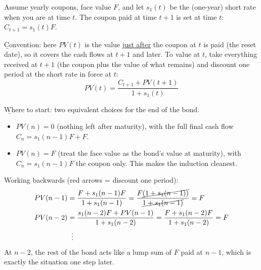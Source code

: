 Assume yearly coupons, face value $F$, and let $s_1(t)$ be the (one-year) short rate when you are at time $t$. The coupon paid at time $t+1$ is set at time $t$: $C_{t+1} = s_1(t)F$.

\begin{center}
\end{center}
\b{Convention}: here $PV(t)$ is the value \ul{just after} the coupon at $t$ is paid (the reset date), so it covers the cash flows at $t+1$ and later. To value at $t$, take everything received at $t+1$ (the coupon plus the value of what remains) and discount one period at the short rate in force at $t$:
\[\boxed{PV(t) = \frac{C_{t+1} + PV(t+1)}{1+s_1(t)}}\]

\b{Where to start}: two equivalent choices for the end of the bond.
\begin{itemize}
    \item $PV(n) = 0$ (nothing left after maturity), with the full final cash flow $C_n = s_1(n-1)F + F$.
    \item $PV(n) = F$ (treat the face value as the bond's value at maturity), with $C_n = s_1(n-1)F$ the coupon only. This makes the induction cleanest.
\end{itemize}

Working backwards (red arrows = discount one period):
\begin{align*}
    PV(n-1) &= \frac{F + s_1(n-1)F}{1+s_1(n-1)} = \frac{F\cancel{(1+s_1(n-1))}}{\cancel{1+s_1(n-1)}} = F\\
    PV(n-2) &= \frac{s_1(n-2)F + PV(n-1)}{1+s_1(n-2)} = \frac{F + s_1(n-2)F}{1+s_1(n-2)} = F\\
    &\;\;\vdots
\end{align*}
At $n-2$, the rest of the bond acts like a lump sum of $F$ paid at $n-1$, which is exactly the situation one step later.

